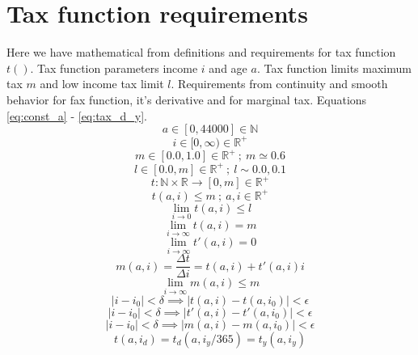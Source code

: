 \section{Tax function requirements}
\label{tax_function_requirements}
Here we have mathematical from definitions and requirements for tax function
$t()$. Tax function parameters income $i$ and age $a$. Tax function limits
maximum tax $m$ and low income tax limit $l$. Requirements from continuity and
smooth behavior for fax function, it's derivative and for marginal tax.
Equations 
\ref{eq:const_a} - \ref{eq:tax_d_y}.
\begin{equation} \label{eq:const_a}
 a \in [0,44000]\in \mathbb{N}
\end{equation}
\begin{equation} \label{eq:const_i}
 i \in [0,\infty)\in \mathbb{R}^+
\end{equation}
\begin{equation} \label{eq:const_m}
 m \in [0.0,1.0] \in \mathbb{R}^+ ~;~ m \simeq 0.6
\end{equation}
\begin{equation} \label{eq:const_l}
 l \in [0.0,m] \in \mathbb{R}^+ ~;~ l \sim 0.0,0.1
\end{equation}
\begin{equation} \label{eq:def_t}
 t:\mathbb{N}\times\mathbb{R} \rightarrow [0,m]\in\mathbb{R}^+
\end{equation}
\begin{equation} \label{eq:tax_t}
 t(a,i)\leq m ~;~ a,i \in \mathbb{R}^+
\end{equation}
\begin{equation} \label{eq:ltax_min}
 \lim_{i \to 0} t(a,i)\leq l
\end{equation}
\begin{equation} \label{eq:ltax_max}
 \lim_{i \to \infty} t(a,i) = m
\end{equation}
\begin{equation} \label{eq:dtax_min}
 \lim_{i \to \infty} t'(a,i)=0
\end{equation}
\begin{equation} \label{eq:tax_mrg}
 m(a,i) = \frac {\Delta t} {\Delta i} = t(a,i)+t'(a,i) i
\end{equation}
\begin{equation} \label{eq:tax_mmax}
 \lim_{i \to \infty} m(a,i)\leq m
\end{equation}
\begin{equation} \label{eq:tax_smooth}
 |i-i_0|<\delta \implies |t(a,i)-t(a,i_0)|<\epsilon
\end{equation}
\begin{equation} \label{eq:dtax_smooth}
 |i-i_0|<\delta \implies |t'(a,i)-t'(a,i_0)|<\epsilon
\end{equation}
\begin{equation} \label{eq:mtax_smooth}
|i-i_0|<\delta \implies |m(a,i)-m(a,i_0)|<\epsilon
\end{equation}
\begin{equation} \label{eq:tax_d_y}
 t(a,i_d)=t_d(a,i_y/365)=t_y(a,i_y)
\end{equation}
